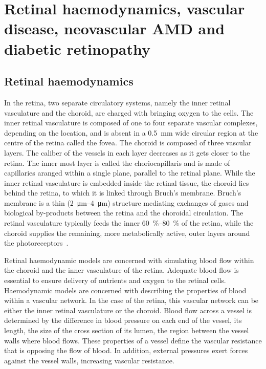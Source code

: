 \documentclass[12pt,a4paper]{journal}
\begin{document}
\section{Retinal haemodynamics, vascular disease, neovascular AMD and diabetic retinopathy}

\subsection{Retinal haemodynamics}

In the retina, two separate circulatory systems, namely the inner retinal vasculature and the choroid, are charged with bringing oxygen to the cells.
The inner retinal vasculature is composed of one to four separate vascular complexes, depending on the location, and is absent in a \SI{0.5}{\mm} wide circular region at the centre of the retina called the fovea.
The choroid is composed of three vascular layers.
The caliber of the vessels in each layer decreases as it gets closer to the retina.
The inner most layer is called the choriocapillaris and is made of capillaries aranged within a single plane, parallel to the retinal plane.
While the inner retinal vasculature is embedded inside the retinal tissue, the choroid lies behind the retina, to which it is linked through Bruch's membrane.
Bruch's membrane is a thin (\SIrange{2}{4}{\micro\meter}) structure mediating exchanges of gases and biological by-products between the retina and the choroidal circulation.
The retinal vasculature typically feeds the inner \SIrange{60}{80}{\percent} of the retina, while the choroid supplies the remaining, more metabolically active, outer layers around the photoreceptors~\cite{Birol_2007}.

Retinal haemodynamic models are concerned with simulating blood flow within the choroid and the inner vasculature of the retina.
Adequate blood flow is essential to ensure delivery of nutrients and oxygen to the retinal cells.
Haemodynamic models are concerned with describing the properties of blood within a vascular network.
In the case of the retina, this vascular network can be either the inner retinal vasculature or the choroid.
Blood flow across a vessel is determined by the difference in blood pressure on each end of the vessel, its length, the size of the cross section of its lumen, the region between the vessel walls where blood flows.
These properties of a vessel define the vascular resistance that is opposing the flow of blood.
In addition, external pressures exert forces against the vessel walls, increasing vascular resistance.
\end{document}
